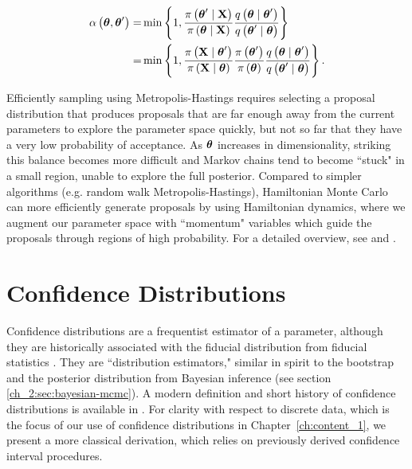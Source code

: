 \begin{align}
\alpha \left( \boldsymbol{\theta}, \boldsymbol{\theta}^\prime \right)   =&   \min \left\{ 1, \frac{\pi \left( \boldsymbol{\theta}^\prime \mid \mathbf{X} \right)}{\pi \left( \boldsymbol{\theta} \mid \mathbf{X} \right)} \frac{q \left( \boldsymbol{\theta} \mid \boldsymbol{\theta}^\prime \right)}{q \left( \boldsymbol{\theta}^\prime \mid \boldsymbol{\theta}  \right)} \right\}    \\
=&  \min \left\{ 1, \frac{\pi \left( \mathbf{X} \mid \boldsymbol{\theta}^\prime  \right)}{\pi \left( \mathbf{X} \mid \boldsymbol{\theta} \right)} \frac{\pi \left( \boldsymbol{\theta}^\prime \right)}{\pi \left( \boldsymbol{\theta} \right)} \frac{q \left( \boldsymbol{\theta} \mid \boldsymbol{\theta}^\prime \right)}{q \left( \boldsymbol{\theta}^\prime \mid \boldsymbol{\theta}  \right)} \right\}.
\end{align}

Efficiently sampling using Metropolis-Hastings requires selecting a proposal distribution that produces proposals that are far enough away from the current parameters to explore the parameter space quickly, but not so far that they have a very low probability of acceptance.
As \( \boldsymbol{\theta} \) increases in dimensionality, striking this balance becomes more difficult and Markov chains tend to become ``stuck" in a small region, unable to explore the full posterior.
Compared to simpler algorithms (e.g. random walk Metropolis-Hastings), Hamiltonian Monte Carlo can more efficiently generate proposals by using Hamiltonian dynamics, where we augment our parameter space with ``momentum" variables which guide the proposals through regions of high probability.
For a detailed overview, see \citet{betancourt2018conceptual} and \citet{neal2011mcmc}.

\section{Confidence Distributions}
\label{ch_2:sec:confidence_distributions}
Confidence distributions are a frequentist estimator of a parameter, although they are historically associated with the fiducial distribution from fiducial statistics \citep{Xie2013}.
They are ``distribution estimators," similar in spirit to the bootstrap and the posterior distribution from Bayesian inference (see section \ref{ch_2:sec:bayesian-mcmc}).
A modern definition and short history of confidence distributions is available in \citet{Xie2013}.
For clarity with respect to discrete data, which is the focus of our use of confidence distributions in Chapter~\ref{ch:content_1}, we present a more classical derivation, which relies on previously derived confidence interval procedures.


